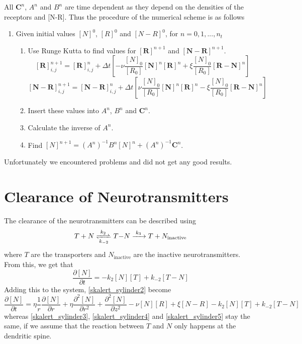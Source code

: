 \documentclass{article}
\begin{document}
All $\boldsymbol{C}^n$, $A^n$ and $B^n$ are time dependent as they depend on the densities of the receptors and [N-R]. Thus the procedure of the numerical scheme is as follows 
\begin{enumerate}
    \item Given initial values $[N]^0$, $[R]^0$ and $[N-R]^0$, for $n = 0, 1, ..., n_t$
    \begin{enumerate}
        \item Use Runge Kutta to find values for  $\boldsymbol{[R]}^{n+1}$ and $\boldsymbol{[N-R]}^{n+1}$. \begin{equation}
            \boldsymbol{[R]}^{n+1}_{i,j} = \boldsymbol{[R]}^{n}_{i,j} + \Delta t \left[- \nu \frac{[N]_0}{[R_0]} \boldsymbol{[N]}^{n} \boldsymbol{[R]}^{n} + \xi \frac{[N]_0}{[R_0]} \boldsymbol{[R-N]}^{n} \right]
        \end{equation} 
        \begin{equation}
            \boldsymbol{[N-R]}^{n+1}_{i,j} = \boldsymbol{[N-R]}^{n}_{i,j} + \Delta t \left[ \nu \frac{[N]_0}{[R_0]} \boldsymbol{[N]}^{n} \boldsymbol{[R]}^{n} - \xi \frac{[N]_0}{[R_0]} \boldsymbol{[R-N]}^{n} \right]
        \end{equation} 
        \item Insert these values into $A^n$, $B^n$ and $\boldsymbol{C}^n$.
        \item Calculate the inverse of $A^n$. 
        \item Find $[N]^{n+1} = (A^n)^{-1} B^n [N]^{n} + (A^n)^{-1}\boldsymbol{C}^n$.  
    \end{enumerate}
\end{enumerate}
Unfortunately we encountered problems and did not get any good results.

\section{Clearance of Neurotransmitters}
The clearance of the neurotransmitters can be described using
\begin{equation*}
\ce{$T$ + $N$ <=>[$k_2$][$k_{-2}$] $T-N$ ->[$k_3$] $T$ + $N_{\text{inactive}}$}
\end{equation*}
where $T$ are the transporters and $N_{\text{inactive}}$ are the inactive neurotransmitters. From this, we get that
\begin{equation*}
    \frac{\partial [N]}{\partial t} = - k_2 [N][T] + k_{-2} [T-N]
\end{equation*}
Adding this to the system, \eqref{skalert_sylinder2} become
\begin{equation}
    \frac{\partial [N]}{\partial t} = 
    \eta \frac{1}{r} \frac{\partial [N]}{\partial r} +\eta  \frac{\partial^2 [N]}{\partial r^2}  +  \frac{\partial^2 [N]}{\partial z^2} -  \nu [N] [R] +  \xi [N-R] - k_2 [N][T] + k_{-2} [T-N]
\end{equation}
whereas \eqref{skalert_sylinder3}, \eqref{skalert_sylinder4} and \eqref{skalert_sylinder5} stay the same, if we assume that the reaction between $T$ and $N$ only happens at the dendritic spine.
\end{document}

